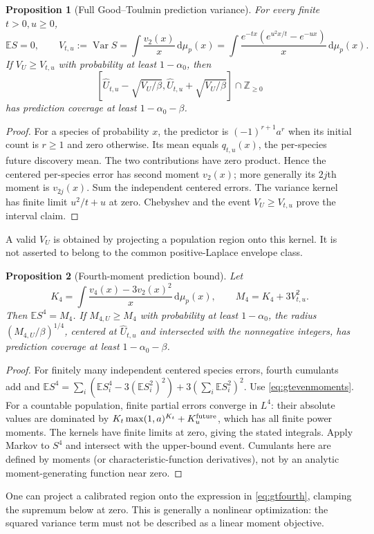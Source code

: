 \documentclass[11pt]{article}
\numberwithin{equation}{section}
\newtheorem{proposition}[proposition]{Proposition}
\theoremstyle{definition}
\theoremstyle{remark}
\newcommand{\E}{\mathbb E}
\newcommand{\Var}{\operatorname{Var}}
\newcommand{\dd}{\,\mathrm d}
\begin{document}
\begin{proposition}[Full Good--Toulmin prediction variance]\label{prop:gtpredictionvariance}
For every finite $t>0,u\ge0$,
\begin{equation}\label{eq:gtpredvar}
 \E S=0,\qquad
 V_{t,u}:=\Var S
 =\int\frac{v_2(x)}x\dd\mu_p(x)
 =\int\frac{e^{-tx}(e^{u^2x/t}-e^{-ux})}{x}\dd\mu_p(x).
\end{equation}
If $V_U\ge V_{t,u}$ with probability at least $1-\alpha_0$, then
\[
 [\widehat U_{t,u}-\sqrt{V_U/\beta},\widehat U_{t,u}+\sqrt{V_U/\beta}]
 \cap\mathbb Z_{\ge0}
\]
has prediction coverage at least $1-\alpha_0-\beta$.
\end{proposition}
\begin{proof}
For a species of probability $x$, the predictor is $(-1)^{r+1}a^r$ when its initial count is $r\ge1$ and zero otherwise. Its mean equals $q_{t,u}(x)$, the per-species future discovery mean. The two contributions have zero product. Hence the centered per-species error has second moment $v_2(x)$; more generally its $2j$th moment is $v_{2j}(x)$. Sum the independent centered errors. The variance kernel has finite limit $u^2/t+u$ at zero. Chebyshev and the event $V_U\ge V_{t,u}$ prove the interval claim.
\end{proof}
A valid $V_U$ is obtained by projecting a population region onto this kernel. It is not asserted to belong to the common positive-Laplace envelope class.

\begin{proposition}[Fourth-moment prediction bound]\label{prop:fourthmoment}
Let
\begin{equation}\label{eq:gtfourth}
 K_4=\int\frac{v_4(x)-3v_2(x)^2}{x}\dd\mu_p(x),\qquad
 M_4=K_4+3V_{t,u}^2.
\end{equation}
Then $\E S^4=M_4$. If $M_{4,U}\ge M_4$ with probability at least $1-\alpha_0$, the radius $(M_{4,U}/\beta)^{1/4}$, centered at $\widehat U_{t,u}$ and intersected with the nonnegative integers, has prediction coverage at least $1-\alpha_0-\beta$.
\end{proposition}
\begin{proof}
For finitely many independent centered species errors, fourth cumulants add and $\E S^4=\sum_i(\E S_i^4-3(\E S_i^2)^2)+3(\sum_i\E S_i^2)^2$. Use \eqref{eq:gtevenmoments}. For a countable population, finite partial errors converge in $L^4$: their absolute values are dominated by $K_t\max(1,a)^{K_t}+K_u^{\rm future}$, which has all finite power moments. The kernels have finite limits at zero, giving the stated integrals. Apply Markov to $S^4$ and intersect with the upper-bound event. Cumulants here are defined by moments (or characteristic-function derivatives), not by an analytic moment-generating function near zero.
\end{proof}
One can project a calibrated region onto the expression in \eqref{eq:gtfourth}, clamping the supremum below at zero. This is generally a nonlinear optimization: the squared variance term must not be described as a linear moment objective.
\end{document}
